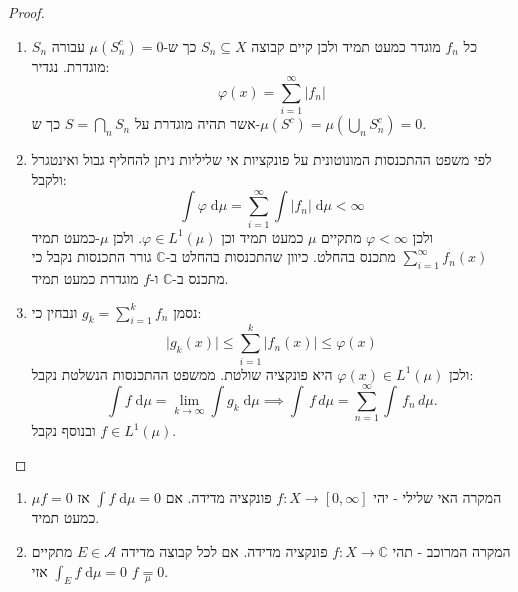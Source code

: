 \documentclass{tstextbook}
\begin{document}
\begin{proof}
  \begin{enumerate}
    \item כל \(f_{n}\) מוגדר כמעט תמיד ולכן קיים קבוצה \(S_{n}\subseteq X\) כך ש-\(\mu(S_{n}^{c})=0\) עבורה \(S_{n}\) מוגדרת. נגדיר: 
$$\varphi(x)=\sum_{i=1}^{\infty}\lvert f_{n} \rvert$$
אשר תהיה מוגדרת על \(S=\bigcap_{n}S_{n}\) כך ש-\(\mu(S^{c})=\mu\left( \bigcup_{n}S_{n}^{c} \right)=0\). 


    \item לפי משפט ההתכנסות המונוטונית על פונקציות אי שליליות ניתן להחליף גבול ואינטגרל ולקבל: 
$$\int \varphi \;\mathrm{d} \mu =\sum_{i=1}^{\infty} \int \lvert f_{n} \rvert  \;\mathrm{d} \mu < \infty $$
ולכן \(\varphi<\infty\) מתקיים \(\mu\) כמעט תמיד וכן \(\varphi \in L^{1}\left( \mu \right)\). ולכן \(\mu\)-כמעט תמיד \(\sum_{i=1}^{\infty}f_{n}(x)\) מתכנס בהחלט. כיוון שהתכנסות בהחלט ב-\(\mathbb{C}\) גורר התכנסות נקבל כי מתכנס ב-\(\mathbb{C}\) ו-\(f\) מוגדרת כמעט תמיד.


    \item נסמן \(g_{k}=\sum_{i=1}^{k}f_{n}\) ונבחין כי: 
$$\lvert g_{k}(x) \rvert \leq \sum_{i=1}^{k} \lvert f_{n}(x) \rvert \leq \varphi(x)$$
ולכן \(\varphi(x)\in L^{1}\left( \mu \right)\) היא פונקציה שולטת. ממשפט ההתכנסות הנשלטת נקבל:
$$\int f \;\mathrm{d} \mu = \lim_{ k \to \infty } \int g_{k} \;\mathrm{d} \mu\implies\int\,f\,d\mu=\sum_{n=1}^{\infty}\int\,f_{n}\,d\mu.$$
ובנוסף נקבל \(f \in L^{1}\left( \mu \right)\).


  \end{enumerate}
\end{proof}
\begin{lemma}
  \begin{enumerate}
    \item המקרה האי שלילי - יהי \(f:X\to\left[ 0,\infty \right]\) פונקציה מדידה. אם \(\int f \;\mathrm{d} \mu=0\) אז \(f=0\)\(\mu\) כמעט תמיד. 


    \item המקרה המרוכב - תהי \(f:X\to \mathbb{C}\) פונקציה מדידה. אם לכל קבוצה מדידה \(E \in \mathcal{A}\) מתקיים \(\int _{E}f \;\mathrm{d} \mu=0\) אזי \(f\underset{\mu}{=} 0\). 


  \end{enumerate}
\end{lemma}
\end{document}
